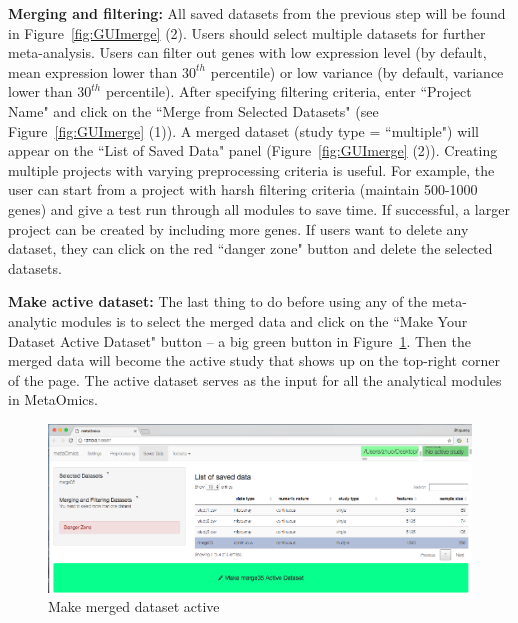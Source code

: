 \begin{steps}
\item \textbf{Merging and filtering:}
All saved datasets from the previous step will be found in  Figure~\ref{fig:GUImerge} {\color{red} (2)}.
Users should select multiple datasets for further meta-analysis.
Users can filter out genes with low expression level (by default, mean expression lower than $30^{th}$ percentile)
or low variance (by default, variance lower than $30^{th}$ percentile).
After specifying filtering criteria, enter ``Project Name" and click on the ``Merge from Selected Datasets" (see Figure~\ref{fig:GUImerge} {\color{red} (1)}).
A merged dataset (study type = ``multiple") will appear on the ``List of Saved Data" panel (Figure~\ref{fig:GUImerge} {\color{red} (2)}).
Creating multiple projects with varying preprocessing criteria is useful.
For example, the user can start from a project with harsh filtering criteria (maintain 500-1000 genes) and give a test run through all modules to save time.
If successful, a larger project can be created by including more genes.
If users want to delete any dataset, they can click on the red ``danger zone" button and delete the selected datasets.

\item \textbf{Make active dataset:}
\label{sec:active}
The last thing to do before using any of the meta-analytic modules is to select the merged data and click on the
``Make Your Dataset Active Dataset" button -- a big green button in Figure~\ref{fig:active}.
Then the merged data will become the active study that shows up on the top-right corner of the page.
The active dataset serves as the input for all the analytical modules in MetaOmics.

\end{steps}







\begin{figure}[H]
\begin{center}
\includegraphics[scale=1]{./figure/preprocessing/GUImarkActive}
\caption{Make merged dataset active}
\label{fig:active}
\end{center}
\end{figure}





